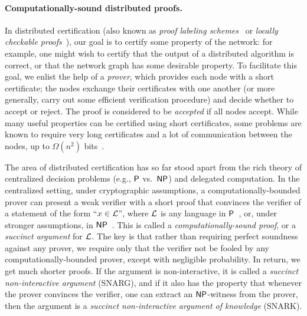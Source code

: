 \paragraph{Computationally-sound distributed proofs.}
In distributed certification (also known as \emph{proof labeling schemes}~\cite{korman2005proof} or \emph{locally checkable proofs}~\cite{LCP}), our goal is to certify some property of the network: for example, one might wish to certify that the output of a distributed algorithm is correct, or that the network graph has some desirable property.
To facilitate this goal, we enlist the help of a \emph{prover}, which provides each node with a short certificate;
the nodes exchange their certificates with one another (or more generally, carry out some efficient verification procedure)
and decide whether to accept or reject.
The proof is considered to be \emph{accepted} if all nodes accept.
While many useful properties can be certified using short certificates, some problems are known to require very long certificates and a lot of communication between the nodes, up to $\Omega(n^2)$ bits~\cite{LCP}.

The area of distributed certification has so far stood apart from the rich theory of  centralized decision problems (e.g., ${\mathsf{P}}$ vs.\ ${\mathsf{NP}}$) and delegated computation. In the centralized setting, under cryptographic assumptions, a computationally-bounded prover can present a weak verifier with a short proof that convinces the verifier of a statement of the form ``$x \in \mathcal{L}$'', where $\mathcal{L}$ is any language in ${\mathsf{P}}$~\cite{choudhuri2021snargs, cryptoeprint:2022/1320}, or, under stronger assumptions, in ${\mathsf{NP}}$~\cite{micali2000computationally, bitansky2013recursive, groth2016size}. This is called a \emph{computationally-sound proof}, or a \emph{succinct argument} for $\mathcal{L}$. 
The key is that rather than requiring perfect soundness against any prover, we require only that the verifier not be fooled by any computationally-bounded prover, except with negligible probability. In return, we get much shorter proofs. If the argument is non-interactive, it is called a \emph{succinct non-interactive argument} (SNARG), and if it also has the property that whenever the prover convinces the verifier, one can extract an ${\mathsf{NP}}$-witness from the prover, then the argument is a \emph{succinct non-interactive argument of knowledge} (SNARK).

